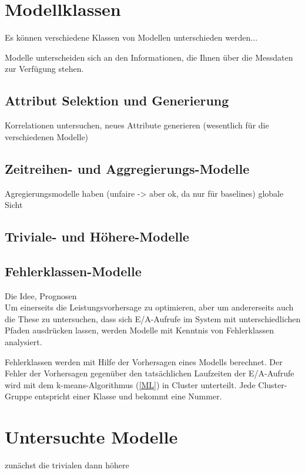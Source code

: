 \documentclass[
	12pt,
	a4paper,
	BCOR10mm,
	DIV14,
	listof=totoc,
	bibliography=totoc,
	headsepline
]{scrreprt}
\begin{document}
\section{Modellklassen}

Es können verschiedene Klassen von Modellen unterschieden werden...

Modelle unterscheiden sich an den Informationen, die Ihnen über die Messdaten zur Verfügung stehen.

\subsection{Attribut Selektion und Generierung}
Korrelationen untersuchen, neues Attribute generieren (wesentlich für die verschiedenen Modelle)\\

\subsection{Zeitreihen- und Aggregierungs-Modelle}
Agregierungsmodelle haben (unfaire -> aber ok, da nur für baselines) globale Sicht\\
\subsection{Triviale- und Höhere-Modelle}
\subsection{Fehlerklassen-Modelle}
Die Idee, Prognosen\\

Um einerseits die Leistungsvorhersage zu optimieren, aber um andererseits auch die These zu untersuchen, dass sich E/A-Aufrufe im System mit unterschiedlichen Pfaden ausdrücken lassen, werden Modelle mit Kenntnis von Fehlerklassen analysiert.

Fehlerklassen werden mit Hilfe der Vorhersagen eines Modells berechnet. Der Fehler der Vorhersagen gegenüber den tatsächlichen Laufzeiten der E/A-Aufrufe wird mit dem k-means-Algorithmus (\ref{ML}) in Cluster unterteilt. Jede Cluster-Gruppe entspricht einer Klasse und bekommt eine Nummer. 

\section{Untersuchte Modelle}
\label{impl:modelle}

zunächst die trivialen dann höhere \\
\end{document}
